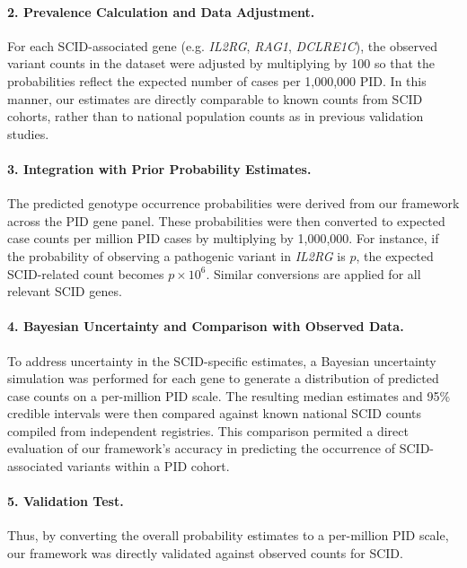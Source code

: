 \paragraph{2. Prevalence Calculation and Data Adjustment.}
For each SCID-associated gene (e.g. \textit{IL2RG}, \textit{RAG1}, \textit{DCLRE1C}), the observed variant counts in the dataset were adjusted by multiplying by 100 so that the probabilities reflect the expected number of cases per 1,000,000 PID. In this manner, our estimates are directly comparable to known counts from SCID cohorts, rather than to national population counts as in previous validation studies.

\paragraph{3. Integration with Prior Probability Estimates.}
The predicted genotype occurrence probabilities were derived from our framework across the PID gene panel. These probabilities were then converted to expected case counts per million PID cases by multiplying by 1,000,000. For instance, if the probability of observing a pathogenic variant in \textit{IL2RG} is \(p\), the expected SCID-related count becomes \(p \times 10^6\). Similar conversions are applied for all relevant SCID genes.

\paragraph{4. Bayesian Uncertainty and Comparison with Observed Data.}
To address uncertainty in the SCID-specific estimates, a Bayesian uncertainty simulation was performed for each gene to generate a distribution of predicted case counts on a per-million PID scale. The resulting median estimates and 95\% credible intervals were then compared against known national SCID counts compiled from independent registries. This comparison permited a direct evaluation of our framework’s accuracy in predicting the occurrence of SCID-associated variants within a PID cohort.

\paragraph{5. Validation Test.}
Thus, by converting the overall probability estimates to a per-million PID scale, our framework was directly validated against observed counts for SCID. %


